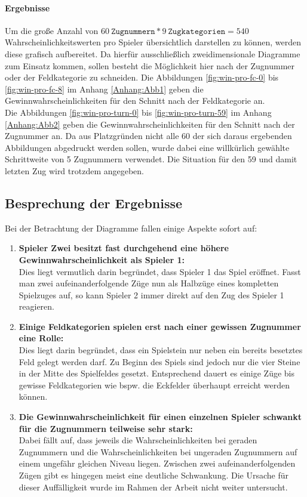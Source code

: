 \paragraph{Ergebnisse}
Um die große Anzahl von $60\ \mathtt{Zugnummern} * 9\ \mathtt{Zugkategorien} = 540$ Wahrscheinlichkeitswerten pro Spieler übersichtlich darstellen zu können, werden diese grafisch aufbereitet. Da hierfür ausschließlich zweidimensionale Diagramme zum Einsatz kommen, sollen besteht die Möglichkeit hier nach der Zugnummer oder der Feldkategorie zu schneiden. Die Abbildungen \ref{fig:win-pro-fc-0} bis \ref{fig:win-pro-fc-8} im Anhang \ref{Anhang:Abb1} geben die Gewinnwahrscheinlichkeiten für den Schnitt nach der Feldkategorie an.
\\Die Abbildungen \ref{fig:win-pro-turn-0} bis \ref{fig:win-pro-turn-59} im Anhang \ref{Anhang:Abb2} geben die Gewinnwahrscheinlichkeiten für den Schnitt nach der Zugnummer an. Da aus Platzgründen nicht alle 60 der sich daraus ergebenden Abbildungen abgedruckt werden sollen, wurde dabei eine willkürlich gewählte Schrittweite von 5 Zugnummern verwendet. Die Situation für den 59 und damit letzten Zug wird trotzdem angegeben.

\subsection{Besprechung der Ergebnisse}
Bei der Betrachtung der Diagramme fallen einige Aspekte sofort auf:
\begin{enumerate}
\item \textbf{Spieler Zwei besitzt fast durchgehend eine höhere Gewinnwahrscheinlichkeit als Spieler 1:}
\\Dies liegt vermutlich darin begründet, dass Spieler 1 das Spiel eröffnet. Fasst man zwei aufeinanderfolgende Züge nun als Halbzüge eines kompletten Spielzuges auf, so kann Spieler 2 immer direkt auf den Zug des Spieler 1 reagieren.
\item \textbf{Einige Feldkategorien spielen erst nach einer gewissen Zugnummer eine Rolle:}
\\Dies liegt darin begründet, dass ein Spielstein nur neben ein bereits besetztes Feld gelegt werden darf. Zu Beginn des Spiels sind jedoch nur die vier Steine in der Mitte des Spielfeldes gesetzt. Entsprechend dauert es einige Züge bis gewisse Feldkategorien wie bspw. die Eckfelder überhaupt erreicht werden können.
\item \textbf{Die Gewinnwahrscheinlichkeit für einen einzelnen Spieler schwankt für die Zugnummern teilweise sehr stark:}
\\Dabei fällt auf, dass jeweils die Wahrscheinlichkeiten bei geraden Zugnummern und die Wahrscheinlichkeiten bei ungeraden Zugnummern auf einem ungefähr gleichen Niveau liegen. Zwischen zwei aufeinanderfolgenden Zügen gibt es hingegen meist eine deutliche Schwankung. Die Ursache für dieser Auffälligkeit wurde im Rahmen der Arbeit nicht weiter untersucht. 
\end{enumerate}